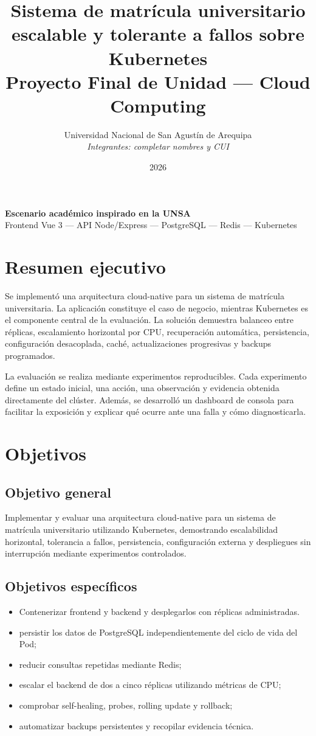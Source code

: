 \documentclass[12pt,a4paper]{article}
\title{\textbf{Sistema de matrícula universitario escalable y tolerante a fallos sobre Kubernetes}\\[0.4cm]
\large Proyecto Final de Unidad --- Cloud Computing}
\author{Universidad Nacional de San Agustín de Arequipa\\
\textit{Integrantes: completar nombres y CUI}}
\date{2026}
\begin{document}
\maketitle
\thispagestyle{empty}
\begin{center}
\vfill
\textbf{Escenario académico inspirado en la UNSA}\\[0.3cm]
Frontend Vue 3 --- API Node/Express --- PostgreSQL --- Redis --- Kubernetes
\vfill
\end{center}
\newpage

\tableofcontents
\newpage

\section{Resumen ejecutivo}
Se implementó una arquitectura cloud-native para un sistema de matrícula universitaria.
La aplicación constituye el caso de negocio, mientras Kubernetes es el componente central
de la evaluación. La solución demuestra balanceo entre réplicas, escalamiento horizontal
por CPU, recuperación automática, persistencia, configuración desacoplada, caché,
actualizaciones progresivas y backups programados.

La evaluación se realiza mediante experimentos reproducibles. Cada experimento define un
estado inicial, una acción, una observación y evidencia obtenida directamente del clúster.
Además, se desarrolló un dashboard de consola para facilitar la exposición y explicar qué
ocurre ante una falla y cómo diagnosticarla.

\section{Objetivos}
\subsection{Objetivo general}
Implementar y evaluar una arquitectura cloud-native para un sistema de matrícula
universitario utilizando Kubernetes, demostrando escalabilidad horizontal, tolerancia a
fallos, persistencia, configuración externa y despliegues sin interrupción mediante
experimentos controlados.

\subsection{Objetivos específicos}
\begin{itemize}
  \item Contenerizar frontend y backend y desplegarlos con réplicas administradas.
  \item persistir los datos de PostgreSQL independientemente del ciclo de vida del Pod;
  \item reducir consultas repetidas mediante Redis;
  \item escalar el backend de dos a cinco réplicas utilizando métricas de CPU;
  \item comprobar self-healing, probes, rolling update y rollback;
  \item automatizar backups persistentes y recopilar evidencia técnica.
\end{itemize}
\end{document}
